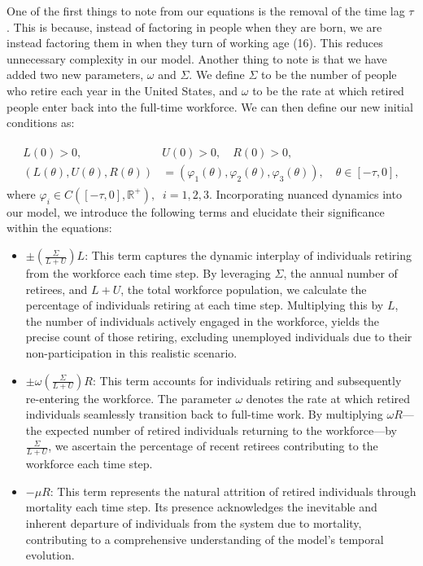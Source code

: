 \documentclass[11pt]{amsart}
\begin{document}
One of the first things to note from our equations is the removal of the time lag $\tau$. 
This is because, instead of factoring in people when they are born, we are instead factoring them
in when they turn of working age (16). This reduces unnecessary complexity in our model. Another thing to note
is that we have added two new parameters, $\omega$ and $\Sigma$. We define $\Sigma$ to be the number of people who
retire each year in the United States, and $\omega$ to be the rate at which retired people enter back
into the full-time workforce. We can then define our new initial conditions as:

\begin{align}
    \begin{split}
        L(0) > 0, \quad &U(0) > 0, \quad R(0) > 0, \\
        (L(\theta),U(\theta), R(\theta)) &= (\varphi_1(\theta), \varphi_2(\theta), \varphi_3(\theta)), \quad \theta \in [-\tau,0],
    \end{split}
\end{align}
where $\varphi_i\in C([-\tau, 0], \mathbb{R}^+),\;\; i=1,2,3$. Incorporating nuanced dynamics into our model, we introduce the following terms and elucidate their significance within the equations:

\begin{itemize}
    \item $\pm\left(\frac{\Sigma}{L + U}\right) L$: This term captures the dynamic interplay of individuals retiring from the workforce each time step. By leveraging $\Sigma$, the annual number of retirees, and $L + U$, the total workforce population, we calculate the percentage of individuals retiring at each time step. Multiplying this by $L$, the number of individuals actively engaged in the workforce, yields the precise count of those retiring, excluding unemployed individuals due to their non-participation in this realistic scenario.

    \item $\pm \omega\left(\frac{\Sigma}{L + U}\right) R$: This term accounts for individuals retiring and subsequently re-entering the workforce. The parameter $\omega$ denotes the rate at which retired individuals seamlessly transition back to full-time work. By multiplying $\omega R$—the expected number of retired individuals returning to the workforce—by $\frac{\Sigma}{L + U}$, we ascertain the percentage of recent retirees contributing to the workforce each time step.

    \item $-\mu R$: This term represents the natural attrition of retired individuals through mortality each time step. Its presence acknowledges the inevitable and inherent departure of individuals from the system due to mortality, contributing to a comprehensive understanding of the model's temporal evolution.
\end{itemize}
\end{document}
